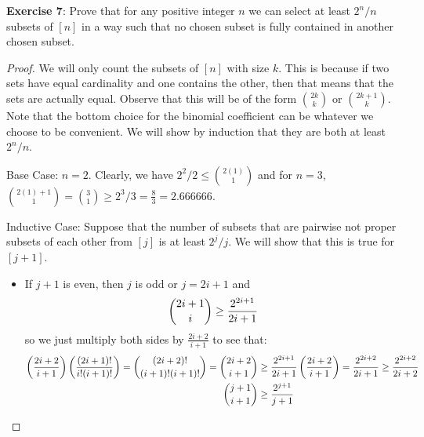 \documentclass{article}
\begin{document}
\textbf{Exercise 7}: Prove that for any positive integer $n$ we can select at least $2^{n}/n$ subsets of $[n]$ in a way such that no chosen subset is fully contained in another chosen subset.
    \begin{proof}
        We will only count the subsets of $[n]$ with size $k$. This is because if two sets have equal cardinality and one contains the other, then that means that the sets are actually equal. Observe that this will be of the form $\binom{2k}{k}$ or $\binom{2k + 1}{k}$. Note that the bottom choice for the binomial coefficient can be whatever we choose to be convenient. We will show by induction that they are both at least $2^{n}/n$.

        Base Case: $n = 2$. Clearly, we have $2^{2}/2 \leq \binom{2(1)}{1}$ and for $n = 3$, $\binom{2(1) + 1}{1} = \binom{3}{1} \geq 2^{3}/3 = \frac{8}{3} = 2.666666$.

        Inductive Case: Suppose that the number of subsets that are pairwise not proper subsets of each other from $[j]$ is at least $2^{j}/j$. We will show that this is true for $[j + 1]$. 
            \begin{itemize}
                \item If $j + 1$ is even, then $j$ is odd or $j = 2i + 1$ and
            \begin{align*}
                \dbinom{2i + 1}{i} \geq \dfrac{2^{2i + 1}}{2i + 1} \\
            \end{align*}
        so we just multiply both sides by $\frac{2i + 2}{i + 1}$ to see that:
            \begin{align*}
                \left(\dfrac{2i + 2}{i + 1}\right)\left(\dfrac{(2i + 1)!}{i!(i + 1)!}\right) = \dbinom{(2i + 2)!}{(i + 1)!(i + 1)!} = \dbinom{2i + 2}{i + 1} &\geq \dfrac{2^{2i + 1}}{2i + 1}\left(\dfrac{2i + 2}{i + 1}\right) = \dfrac{2^{2i + 2}}{2i + 1} \geq \dfrac{2^{2i + 2}}{2i + 2}\\
                \dbinom{j + 1}{i + 1} &\geq \dfrac{2^{j + 1}}{j + 1}
            \end{align*}


\end{itemize}
\end{proof}
\end{document}
